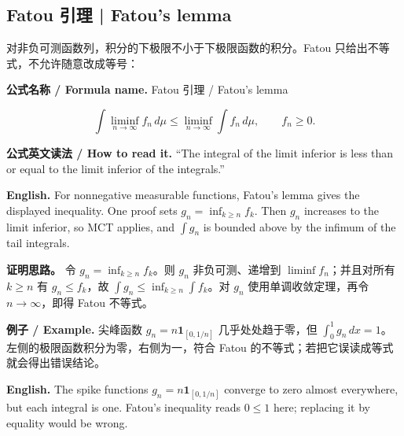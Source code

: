 \documentclass[UTF8,11pt,a4paper]{ctexart}
\newcommand{\EN}[1]{\par\noindent\textbf{English.} #1\par}
\newcommand{\READ}[1]{\par\noindent\textbf{公式英文读法 / How to read it.} #1\par}
\let\APSsubsection\subsection
\renewcommand{\subsection}[1]{\Needspace{6\baselineskip}\APSsubsection{#1}}
\newcommand{\FORMULA}[2]{\par\Needspace{3\baselineskip}\noindent\textbf{公式名称 / Formula name.} #1 / #2\par}
\newcommand{\EX}[2]{\par\noindent\textbf{例子 / Example.} #1\par\EN{#2}}
\begin{document}
\subsection{Fatou 引理 | Fatou's lemma}
\noindent 对非负可测函数列，积分的下极限不小于下极限函数的积分。Fatou 只给出不等式，不允许随意改成等号：
\FORMULA{Fatou 引理}{Fatou's lemma}
\[
\int\liminf_{n\to\infty}f_n\,d\mu
\le\liminf_{n\to\infty}\int f_n\,d\mu,
\qquad f_n\ge0.
\]
\READ{“The integral of the limit inferior is less than or equal to the limit inferior of the integrals.”}
\EN{For nonnegative measurable functions, Fatou's lemma gives the displayed inequality. One proof sets $g_n=\inf_{k\ge n}f_k$. Then $g_n$ increases to the limit inferior, so MCT applies, and $\int g_n$ is bounded above by the infimum of the tail integrals.}
\noindent\textbf{证明思路。} 令 $g_n=\inf_{k\ge n}f_k$。则 $g_n$ 非负可测、递增到 $\liminf f_n$；并且对所有 $k\ge n$ 有 $g_n\le f_k$，故 $\int g_n\le\inf_{k\ge n}\int f_k$。对 $g_n$ 使用单调收敛定理，再令 $n\to\infty$，即得 Fatou 不等式。
\EX{尖峰函数 $g_n=n\mathbf1_{[0,1/n]}$ 几乎处处趋于零，但 $\int_0^1g_n\,dx=1$。左侧的极限函数积分为零，右侧为一，符合 Fatou 的不等式；若把它误读成等式就会得出错误结论。}{The spike functions $g_n=n\mathbf1_{[0,1/n]}$ converge to zero almost everywhere, but each integral is one. Fatou's inequality reads $0\le1$ here; replacing it by equality would be wrong.}
\end{document}
